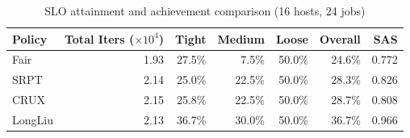 \begin{table}[t]
\centering
\caption{SLO attainment and achievement comparison (16 hosts, 24 jobs)}
\label{tab:slo_16host}
\begin{tabular}{l|r|r|r|r|r|r}
\hline
Policy & Total Iters ($\times 10^4$) & Tight & Medium & Loose & Overall & SAS \\
\hline
Fair & 1.93 & 27.5\% & 7.5\% & 50.0\% & 24.6\% & 0.772 \\
SRPT & 2.14 & 25.0\% & 22.5\% & 50.0\% & 28.3\% & 0.826 \\
CRUX & 2.15 & 25.8\% & 22.5\% & 50.0\% & 28.7\% & 0.808 \\
LongLiu & 2.13 & 36.7\% & 30.0\% & 50.0\% & 36.7\% & 0.966 \\
\hline
\end{tabular}
\end{table}
